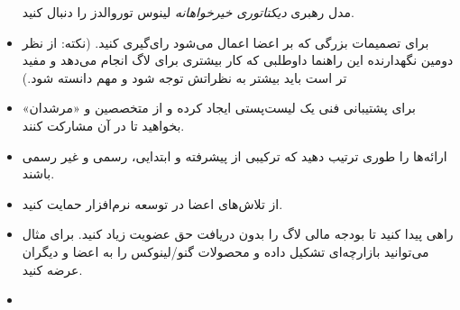 \begin{itemize}
مدل رهبری
{\itshape دیکتاتوری خیرخواهانه}
لینوس توروالدز را دنبال کنید.
\item
برای تصمیمات بزرگی که بر اعضا اعمال می‌شود رای‌گیری کنید.
(نکته: از نظر دومین نگهدارنده این راهنما داوطلبی که کار بیشتری برای لاگ
انجام می‌دهد و مفید تر است باید بیشتر به نظراتش توجه شود و مهم دانسته شود.)
\item
برای پشتیبانی فنی یک لیست‌پستی ایجاد کرده و از متخصصین و «مرشدان» بخواهید تا
در آن مشارکت کنند.
\item
ارائه‌ها را طوری ترتیب دهید که ترکیبی از پیشرفته و ابتدایی، رسمی و غیر رسمی باشند.
\item
از تلاش‌های اعضا در توسعه نرم‌افزار حمایت کنید.
\item
راهی پیدا کنید تا بودجه مالی لاگ را بدون دریافت حق عضویت زیاد کنید.
برای مثال می‌توانید بازارچه‌ای تشکیل داده و محصولات گنو/لینوکس را به اعضا و
دیگران عرضه کنید.
\item


\end{itemize}
